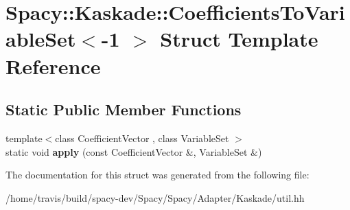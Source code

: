 \hypertarget{structSpacy_1_1Kaskade_1_1CoefficientsToVariableSet_3-1_01_4}{\section{Spacy\-:\-:Kaskade\-:\-:Coefficients\-To\-Variable\-Set$<$-\/1 $>$ Struct Template Reference}
\label{structSpacy_1_1Kaskade_1_1CoefficientsToVariableSet_3-1_01_4}
}
\subsection*{Static Public Member Functions}
\begin{DoxyCompactItemize}
\item 
\hypertarget{structSpacy_1_1Kaskade_1_1CoefficientsToVariableSet_3-1_01_4_a0cd221cfb9e6fb4d459e2f302a85e743}{{\footnotesize template$<$class Coefficient\-Vector , class Variable\-Set $>$ }\\static void {\bfseries apply} (const Coefficient\-Vector \&, Variable\-Set \&)}\label{structSpacy_1_1Kaskade_1_1CoefficientsToVariableSet_3-1_01_4_a0cd221cfb9e6fb4d459e2f302a85e743}

\end{DoxyCompactItemize}


The documentation for this struct was generated from the following file\-:\begin{DoxyCompactItemize}
\item 
/home/travis/build/spacy-\/dev/\-Spacy/\-Spacy/\-Adapter/\-Kaskade/util.\-hh\end{DoxyCompactItemize}

